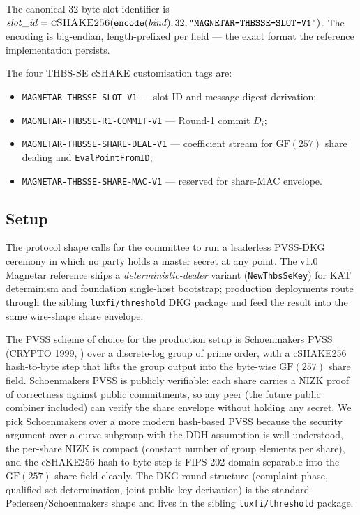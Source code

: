 The canonical 32-byte slot identifier is
$\mathit{slot\_id} = \textsc{cSHAKE256}(\texttt{encode}(\mathit{bind}),
32, \texttt{"MAGNETAR-THBSSE-SLOT-V1"})$. The encoding is
big-endian, length-prefixed per field --- the exact format the
reference implementation persists.

The four THBS-SE cSHAKE customisation tags are:

\begin{itemize}[leftmargin=2em,nosep]
  \item \texttt{MAGNETAR-THBSSE-SLOT-V1} --- slot ID and message
        digest derivation;
  \item \texttt{MAGNETAR-THBSSE-R1-COMMIT-V1} --- Round-1 commit
        $D_i$;
  \item \texttt{MAGNETAR-THBSSE-SHARE-DEAL-V1} --- coefficient
        stream for $\mathrm{GF}(257)$ share dealing and
        \texttt{EvalPointFromID};
  \item \texttt{MAGNETAR-THBSSE-SHARE-MAC-V1} --- reserved for
        share-MAC envelope.
\end{itemize}

\subsection{Setup}
\label{sec:thbsse:setup}

The protocol shape calls for the committee to run a leaderless
PVSS-DKG ceremony in which no party holds a master secret at any
point. The v1.0 Magnetar reference ships a
\emph{deterministic-dealer} variant
(\texttt{NewThbsSeKey}) for KAT determinism and foundation
single-host bootstrap; production deployments route through the
sibling \texttt{luxfi/threshold} DKG package and feed the result
into the same wire-shape share envelope.

The PVSS scheme of choice for the production setup is
Schoenmakers PVSS (CRYPTO 1999, \cite{schoenmakers1999}) over a
discrete-log group of prime order, with a cSHAKE256 hash-to-byte
step that lifts the group output into the byte-wise
$\mathrm{GF}(257)$ share field. Schoenmakers PVSS is publicly
verifiable: each share carries a NIZK proof of correctness against
public commitments, so any peer (the future public combiner
included) can verify the share envelope without holding any
secret. We pick Schoenmakers over a more modern hash-based PVSS
because the security argument over a curve subgroup with the DDH
assumption is well-understood, the per-share NIZK is compact
(constant number of group elements per share), and the
cSHAKE256 hash-to-byte step is FIPS 202-domain-separable into the
$\mathrm{GF}(257)$ share field cleanly. The DKG round structure
(complaint phase, qualified-set determination, joint public-key
derivation) is the standard Pedersen/Schoenmakers shape and lives
in the sibling \texttt{luxfi/threshold} package.

